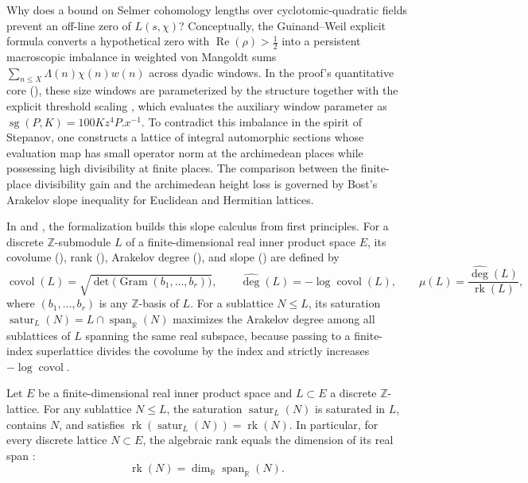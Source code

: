 Why does a bound on Selmer cohomology lengths over cyclotomic-quadratic fields
prevent an off-line zero of $L(s, \chi)$?
Conceptually, the Guinand--Weil explicit formula converts a hypothetical zero
with $\operatorname{Re}(\rho) > \tfrac{1}{2}$ into a persistent macroscopic
imbalance in weighted von Mangoldt sums $\sum_{n \le X} \Lambda(n)\chi(n) w(n)$
across dyadic windows.
In the proof's quantitative core (),
these size windows are parameterized by the structure
together with the explicit threshold scaling
,
which evaluates the auxiliary window parameter as
$\operatorname{sg}(P, K) = 100 K z^4 P.x^{-1}$.
To contradict this imbalance in the spirit of Stepanov, one constructs a
lattice of integral automorphic sections whose evaluation map has small
operator norm at the archimedean places while possessing high divisibility at
finite places.
The comparison between the finite-place divisibility gain and the archimedean
height loss is governed by Bost's Arakelov slope inequality for Euclidean and
Hermitian lattices.

In  and ,
the formalization builds this slope calculus from first principles.
For a discrete $\mathbb{Z}$-submodule $L$ of a finite-dimensional real inner
product space $E$, its covolume (), rank
(), Arakelov degree (), and
slope () are defined by
\[
  \operatorname{covol}(L) = \sqrt{\det\bigl(\operatorname{Gram}(b_1, \dots, b_r)\bigr)},
  \qquad
  \widehat{\deg}(L) = -\log\operatorname{covol}(L),
  \qquad
  \mu(L) = \frac{\widehat{\deg}(L)}{\operatorname{rk}(L)},
\]
where $(b_1, \dots, b_r)$ is any $\mathbb{Z}$-basis of $L$.
For a sublattice $N \le L$, its saturation
$\operatorname{satur}_L(N) = L \cap \operatorname{span}_{\mathbb{R}}(N)$
maximizes the Arakelov degree among all sublattices of $L$ spanning the same
real subspace, because passing to a finite-index superlattice divides the
covolume by the index and strictly increases $-\log\operatorname{covol}$.

\begin{proposition}
\label{prop:ch02-lattice-saturation}
Let $E$ be a finite-dimensional real inner product space and $L \subset E$ a
discrete $\mathbb{Z}$-lattice.
For any sublattice $N \le L$, the saturation $\operatorname{satur}_L(N)$ is
saturated in $L$, contains $N$, and satisfies
$\operatorname{rk}(\operatorname{satur}_L(N)) = \operatorname{rk}(N)$.
In particular, for every discrete lattice $N \subset E$, the algebraic rank
equals the dimension of its real span :
\[
  \operatorname{rk}(N) = \dim_{\mathbb{R}} \operatorname{span}_{\mathbb{R}}(N).
\]
\end{proposition}

